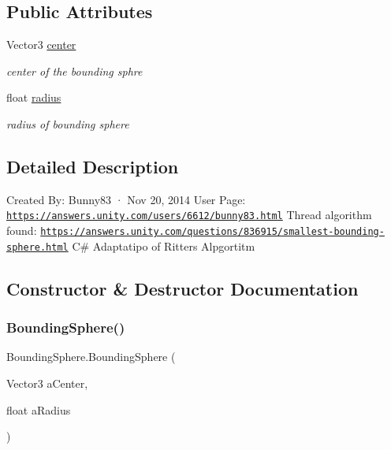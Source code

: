 \subsection*{Public Attributes}
\begin{DoxyCompactItemize}
\item 
Vector3 \mbox{\hyperlink{class_bounding_sphere_a0996d0f450c5e7fcca8446ebbd8ddc20}{center}}
\begin{DoxyCompactList}\small\item\em center of the bounding sphre \end{DoxyCompactList}\item 
float \mbox{\hyperlink{class_bounding_sphere_ad507cd54bc4021617024c2545fe9379c}{radius}}
\begin{DoxyCompactList}\small\item\em radius of bounding sphere \end{DoxyCompactList}\end{DoxyCompactItemize}


\subsection{Detailed Description}
Created By\+: Bunny83 · Nov 20, 2014 User Page\+: \href{https://answers.unity.com/users/6612/bunny83.html}{\tt https\+://answers.\+unity.\+com/users/6612/bunny83.\+html} Thread algorithm found\+: \href{https://answers.unity.com/questions/836915/smallest-bounding-sphere.html}{\tt https\+://answers.\+unity.\+com/questions/836915/smallest-\/bounding-\/sphere.\+html} C\# Adaptatipo of Ritters Alpgortitm 



\subsection{Constructor \& Destructor Documentation}
\mbox{\label{class_bounding_sphere_ad35e7960a2e532e8f7cbebbca2136ef7}} 
\subsubsection{\texorpdfstring{Bounding\+Sphere()}{BoundingSphere()}}
{\footnotesize\ttfamily Bounding\+Sphere.\+Bounding\+Sphere (\begin{DoxyParamCaption}\item[{Vector3}]{a\+Center,  }\item[{float}]{a\+Radius }\end{DoxyParamCaption})}


